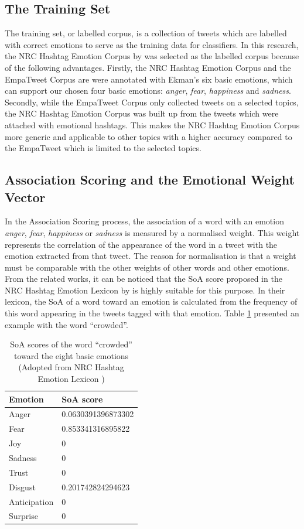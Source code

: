 \subsection{The Training Set}
The training set, or labelled corpus, is a collection of tweets which are labelled with correct emotions to serve as the training data for classifiers. In this research, the NRC Hashtag Emotion Corpus by \citet{mohammad2014using} was selected as the labelled corpus because of the following advantages. Firstly, the NRC Hashtag Emotion Corpus and the EmpaTweet Corpus are were annotated with Ekman's six basic emotions, which can support our chosen four basic emotions: \textit{anger}, \textit{fear}, \textit{happiness} and \textit{sadness}. Secondly, while the EmpaTweet Corpus only collected tweets on a selected topics, the NRC Hashtag Emotion Corpus was built up from the tweets which were attached with emotional hashtags. This makes the NRC Hashtag Emotion Corpus more generic and applicable to other topics with a higher accuracy compared to the EmpaTweet which is limited to the selected topics.

\subsection{Association Scoring and the Emotional Weight Vector}
In the Association Scoring process, the association of a word with an emotion \textit{anger}, \textit{fear}, \textit{happiness} or \textit{sadness} is measured by a normalised weight. This weight represents the correlation of the appearance of the word in a tweet with the emotion extracted from that tweet. The reason for normalisation is that a weight must be comparable with the other weights of other words and other emotions. From the related works, it can be noticed that the SoA score proposed in the NRC Hashtag Emotion Lexicon by \citet{mohammad2014using} is highly suitable for this purpose. In their lexicon, the SoA of a word toward an emotion is calculated from the frequency of this word appearing in the tweets tagged with that emotion. Table \ref{table:soaOfCrowded} presented an example with the word ``crowded''.

\begin{table}[htb!]
\centering
\caption{SoA scores of the word ``crowded'' toward the eight basic emotions (Adopted from NRC Hashtag Emotion Lexicon \citep{mohammad2014using})}
\label{table:soaOfCrowded}
\begin{tabular}{|l|l|}
\hline
\textbf{Emotion} & \textbf{SoA score} \\ \hline \hline
Anger & 0.0630391396873302 \\ \hline
Fear & 0.853341316895822 \\ \hline
Joy & 0 \\ \hline
Sadness & 0 \\ \hline
Trust & 0 \\ \hline
Disgust & 0.201742824294623 \\ \hline
Anticipation & 0 \\ \hline
Surprise & 0 \\ \hline
\end{tabular}
\end{table}


